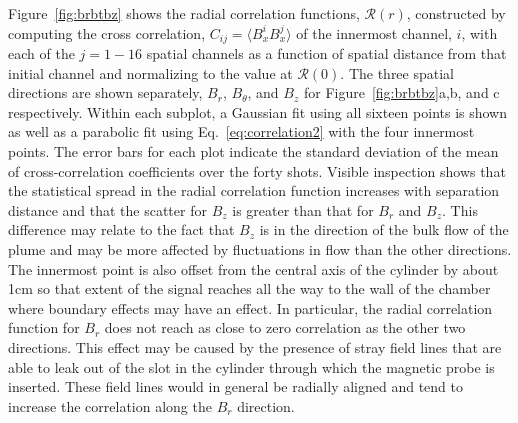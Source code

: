 \documentclass[aps,prl,amsmath,amssymb,reprint,superscriptaddress]{revtex4-1} %
\begin{document}
Figure~\ref{fig:brbtbz} shows the radial correlation functions, $\mathcal{R}(r)$, constructed by computing the cross correlation, $C_{ij} = \langle B_x^i B_x^j\rangle$ of the innermost channel, $i$, with each of the $j=1-16$ spatial channels as a function of spatial distance from that initial channel and normalizing to the value at $\mathcal{R}(0)$. The three spatial directions are shown separately, $B_{r}$, $B_{\theta}$, and $B_{z}$ for Figure~\ref{fig:brbtbz}a,b, and c respectively. Within each subplot, a Gaussian fit using all sixteen points is shown as well as a parabolic fit using Eq.~\ref{eq:correlation2} with the four innermost points. The error bars for each plot indicate the standard deviation of the mean of cross-correlation coefficients over the forty shots. Visible inspection shows that the statistical spread in the radial correlation function increases with separation distance and that the scatter for $B_{z}$ is greater than that for $B_{r}$ and $B_{z}$. This difference may relate to the fact that $B_{z}$ is in the direction of the bulk flow of the plume and may be more affected by fluctuations in flow than the other directions. The innermost point is also offset from the central axis of the cylinder by about 1cm so that extent of the signal reaches all the way to the wall of the chamber where boundary effects may have an effect. In particular, the radial correlation function for $B_{r}$ does not reach as close to zero correlation as the other two directions. This effect may be caused by the presence of stray field lines that are able to leak out of the slot in the cylinder through which the magnetic probe is inserted. These field lines would in general be radially aligned and tend to increase the correlation along the $B_{r}$ direction.
\end{document}

